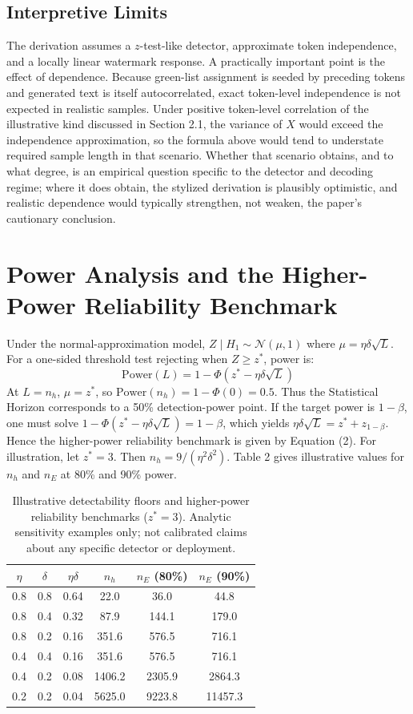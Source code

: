 \documentclass[11pt]{article}
\begin{document}
\subsection{Interpretive Limits}
The derivation assumes a $z$-test-like detector, approximate token independence, and
a locally linear watermark response. A practically important point is the effect of
dependence. Because green-list assignment is seeded by preceding tokens and generated
text is itself autocorrelated, exact token-level independence is not expected in
realistic samples. Under positive token-level correlation of the illustrative kind
discussed in Section 2.1, the variance of $X$ would exceed the independence
approximation, so the formula above would tend to understate required sample
length in that scenario. Whether that scenario obtains, and to what degree, is an
empirical question specific to the detector and decoding regime; where it does
obtain, the stylized derivation is plausibly optimistic, and realistic dependence
would typically strengthen, not weaken, the paper's cautionary conclusion.
\section{Power Analysis and the Higher-Power Reliability Benchmark}
Under the normal-approximation model, $Z \mid H_1 \sim \mathcal{N}(\mu, 1)$ where
$\mu = \eta\delta\sqrt{L}$. For a one-sided threshold test rejecting when $Z \geq
z^*$, power is:
\begin{equation}
\mathrm{Power}(L) = 1 - \Phi(z^* - \eta\delta\sqrt{L})
\end{equation}
At $L = n_h$, $\mu = z^*$, so $\mathrm{Power}(n_h) = 1 - \Phi(0) = 0.5$. Thus the
Statistical Horizon corresponds to a 50\% detection-power point.
If the target power is $1-\beta$, one must solve $1 - \Phi(z^* - \eta\delta\sqrt{L})
= 1-\beta$, which yields $\eta\delta\sqrt{L} = z^* + z_{1-\beta}$. Hence the
higher-power reliability benchmark is given by Equation (2).
For illustration, let $z^* = 3$. Then $n_h = 9/(\eta^2\delta^2)$. Table 2 gives
illustrative values for $n_h$ and $n_E$ at 80\% and 90\% power.
\begin{table}[h]
\centering
\caption{Illustrative detectability floors and higher-power reliability benchmarks
($z^* = 3$). Analytic sensitivity examples only; not calibrated claims about any
specific detector or deployment.}
\begin{tabular}{cccccc}
\toprule
$\eta$ & $\delta$ & $\eta\delta$ & $n_h$ & $n_E$ (80\%) & $n_E$ (90\%)\\
\midrule
0.8 & 0.8 & 0.64 & 22.0 & 36.0 & 44.8\\
0.8 & 0.4 & 0.32 & 87.9 & 144.1 & 179.0\\
0.8 & 0.2 & 0.16 & 351.6 & 576.5 & 716.1\\
0.4 & 0.4 & 0.16 & 351.6 & 576.5 & 716.1\\
0.4 & 0.2 & 0.08 & 1406.2 & 2305.9 & 2864.3\\
0.2 & 0.2 & 0.04 & 5625.0 & 9223.8 & 11457.3\\
\bottomrule
\end{tabular}
\end{table}
\end{document}
